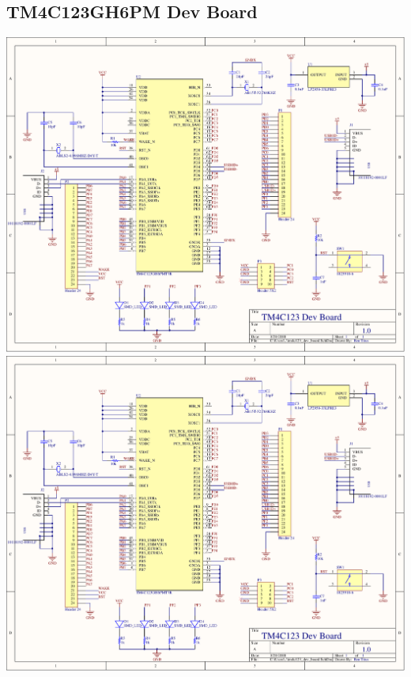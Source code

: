 \begin{flushleft}
\section{TM4C123GH6PM Dev Board}
\end{flushleft}
\label{app:tm4c_dev_board}
\begin{center}
\includegraphics[page=1,width=\textwidth,angle=270]{PDFs/tm4c123_dev_board.PDF} \newpage
\includegraphics[page=2,width=\textwidth,angle=270]{PDFs/tm4c123_dev_board.PDF} \newpage

\end{center}
